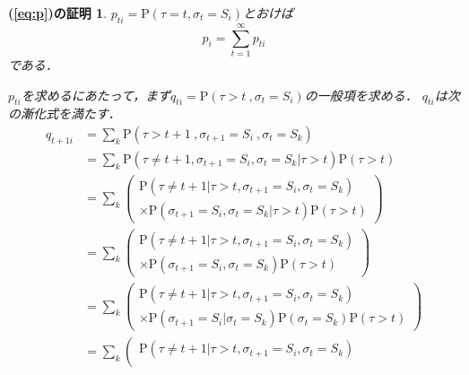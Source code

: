 \newtheorem*{theorem}{(\ref{eq:p})の証明}
\begin{theorem}
    $ p_{t i} = \mathrm{P}(\tau = t , \sigma_t = S_i) $とおけば
    \begin{equation} \label{eq:p_sum_pt}
        p_i = \sum_{t=1}^{\infty}p_{t i}
    \end{equation}
    である．

    $ p_{t i} $を求めるにあたって，まず$ q_{t i} = \mathrm{P}(\tau > t\ ,\sigma_t = S_i) $の一般項を求める．
    $ q_{t i} $は次の漸化式を満たす．
    \begin{align*}
        q_{t+1 i} & = \! \sum_{k} \mathrm{P}(\tau \! > \! t + 1\ , \sigma_{t+1} \! = \! S_i\ , \sigma_t \! = \! S_k) \\
        & = \! \sum_{k} \mathrm{P}(\tau \! \ne \! t + 1 , \sigma_{t+1} \! = \! S_i , \sigma_t \! = \! S_k | \tau \! > \! t) \mathrm{P}(\tau \! > \! t) \\
        & = \! \sum_{k} \left(
            \begin{array}{l}
                \mathrm{P}(\tau \! \ne \! t + 1 | \tau \! > \! t , \sigma_{t+1} \! = \! S_i , \sigma_t \! = \! S_k) \\
                \times \mathrm{P}(\sigma_{t+1} \! = \! S_i , \sigma_t \! = \! S_k | \tau \! > \! t) \mathrm{P}(\tau \! > \! t)
            \end{array}
         \right) \\
        & = \! \sum_{k} \left(
            \begin{array}{l}
                \mathrm{P}(\tau \! \ne \! t + 1 | \tau \! > \! t , \sigma_{t+1} \! = \! S_i , \sigma_t \! = \! S_k) \\
                \times \mathrm{P}(\sigma_{t+1} \! = \! S_i , \sigma_t \! = \! S_k) \mathrm{P}(\tau \! > \! t)
            \end{array}
        \right) \\
        & = \! \sum_{k} \left(
            \begin{array}{l}
                \mathrm{P}(\tau \! \ne \! t + 1 | \tau \! > \! t , \sigma_{t+1} \! = \! S_i , \sigma_t \! = \! S_k) \\
                \times \mathrm{P}(\sigma_{t+1} \! = \! S_i | \sigma_t \! = \! S_k) \mathrm{P}(\sigma_t \! = \! S_k) \mathrm{P}(\tau \! > \! t)
            \end{array}
        \right) \\
        & = \! \sum_{k} \left(
            \begin{array}{l}
                \mathrm{P}(\tau \! \ne \! t + 1 | \tau \! > \! t , \sigma_{t+1} \! = \! S_i , \sigma_t \! = \! S_k) \\

\end{array}
\end{align*}
\end{theorem}
